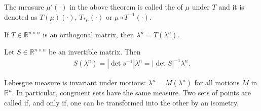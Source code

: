     \begin{definition}
        The measure $\mu'(\cdot)$ in the above theorem is called the  of $\mu$ under $T$ and it is denoted as 
        $T(\mu)(\cdot)$, $T_{*\mu}(\cdot)$ or $\mu\circ T^{-1}(\cdot)$.
    \end{definition}

    \begin{theorem}
        If $T\in \mathbb R^{n\times n} $ is an orthogonal matrix, then $\lambda^n = T(\lambda^n).$
    \end{theorem}

    \begin{theorem}
        Let $S\in\mathbb R^{n\times n}$ be an invertible matrix. Then 
        \begin{align*}
        S(\lambda^n) = |\det s^{-1}|\lambda^n = |\det S|^{-1}\lambda^n.    
        \end{align*}
    \end{theorem}

    \begin{corollary}
        Lebesgue measure is invariant under motions: $\lambda^n=M(\lambda^n)$ for all motions $M$ in $\mathbb R^n$. In particular, congruent sets have the same measure. Two sets of points are called  if, and only if, one can be transformed into the other by an isometry.
    \end{corollary}